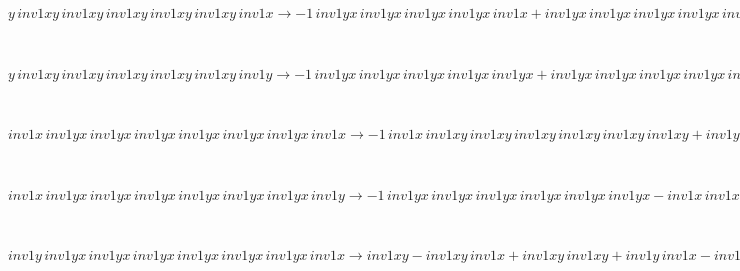 \begin{minipage}{6in}
$
y\,
 inv1xy\,
 inv1xy\,
 inv1xy\,
 inv1xy\,
 inv1xy\,
 inv1x\rightarrow -1\,
 inv1yx\,
 inv1yx\,
 inv1yx\,
 inv1yx\,
 inv1x + inv1yx\,
 inv1yx\,
 inv1yx\,
 inv1yx\,
 inv1yx\,
 inv1x + y\,
 inv1xy\,
 inv1xy\,
 inv1xy\,
 inv1xy\,
 inv1xy
$
\end{minipage}\medskip \\
\begin{minipage}{6in}
$
y\,
 inv1xy\,
 inv1xy\,
 inv1xy\,
 inv1xy\,
 inv1xy\,
 inv1y\rightarrow -1\,
 inv1yx\,
 inv1yx\,
 inv1yx\,
 inv1yx\,
 inv1yx + inv1yx\,
 inv1yx\,
 inv1yx\,
 inv1yx\,
 inv1yx\,
 inv1y
$
\end{minipage}\medskip \\
\begin{minipage}{6in}
$
inv1x\,
 inv1yx\,
 inv1yx\,
 inv1yx\,
 inv1yx\,
 inv1yx\,
 inv1yx\,
 inv1x\rightarrow -1\,
 inv1x\,
 inv1xy\,
 inv1xy\,
 inv1xy\,
 inv1xy\,
 inv1xy\,
 inv1xy + inv1yx\,
 inv1yx\,
 inv1yx\,
 inv1yx\,
 inv1yx\,
 inv1yx\,
 inv1x + inv1x\,
 inv1xy\,
 inv1xy\,
 inv1xy\,
 inv1xy\,
 inv1xy\,
 inv1xy\,
 inv1x
$
\end{minipage}\medskip \\
\begin{minipage}{6in}
$
inv1x\,
 inv1yx\,
 inv1yx\,
 inv1yx\,
 inv1yx\,
 inv1yx\,
 inv1yx\,
 inv1y\rightarrow -1\,
 inv1yx\,
 inv1yx\,
 inv1yx\,
 inv1yx\,
 inv1yx\,
 inv1yx - inv1x\,
 inv1xy\,
 inv1xy\,
 inv1xy\,
 inv1xy\,
 inv1xy\,
 inv1y + inv1x\,
 inv1yx\,
 inv1yx\,
 inv1yx\,
 inv1yx\,
 inv1yx\,
 inv1yx + inv1yx\,
 inv1yx\,
 inv1yx\,
 inv1yx\,
 inv1yx\,
 inv1yx\,
 inv1y + inv1x\,
 inv1xy\,
 inv1xy\,
 inv1xy\,
 inv1xy\,
 inv1xy\,
 inv1xy\,
 inv1y
$
\end{minipage}\medskip \\
\begin{minipage}{6in}
$
inv1y\,
 inv1yx\,
 inv1yx\,
 inv1yx\,
 inv1yx\,
 inv1yx\,
 inv1yx\,
 inv1x\rightarrow inv1xy - inv1xy\,
 inv1x + inv1xy\,
 inv1xy + inv1y\,
 inv1x - inv1y\,
 inv1xy - inv1xy\,
 inv1xy\,
 inv1x + inv1xy\,
 inv1xy\,
 inv1xy + inv1y\,
 inv1xy\,
 inv1x - inv1y\,
 inv1xy\,
 inv1xy - inv1xy\,
 inv1xy\,
 inv1xy\,
 inv1x + inv1xy\,
 inv1xy\,
 inv1xy\,
 inv1xy + inv1y\,
 inv1xy\,
 inv1xy\,
 inv1x - inv1y\,
 inv1xy\,
 inv1xy\,
 inv1xy - inv1xy\,
 inv1xy\,
 inv1xy\,
 inv1xy\,
 inv1x + inv1xy\,
 inv1xy\,
 inv1xy\,
 inv1xy\,
 inv1xy + inv1y\,
 inv1xy\,
 inv1xy\,
 inv1xy\,
 inv1x - inv1y\,
 inv1xy\,
 inv1xy\,
 inv1xy\,
 inv1xy - inv1xy\,
 inv1xy\,
 inv1xy\,
 inv1xy\,
 inv1xy\,
 inv1x + inv1xy\,
 inv1xy\,
 inv1xy\,
 inv1xy\,
 inv1xy\,
 inv1xy + inv1y\,
 inv1xy\,
 inv1xy\,
 inv1xy\,
 inv1xy\,
 inv1x - inv1y\,
 inv1xy\,
 inv1xy\,
 inv1xy\,
 inv1xy\,
 inv1xy - inv1xy\,
 inv1xy\,
 inv1xy\,
 inv1xy\,
 inv1xy\,
 inv1xy\,
 inv1x + inv1y\,
 inv1xy\,
 inv1xy\,
 inv1xy\,
 inv1xy\,
 inv1xy\,
 inv1x - inv1y\,
 inv1xy\,
 inv1xy\,
 inv1xy\,
 inv1xy\,
 inv1xy\,
 inv1xy + inv1y\,
 inv1xy\,
 inv1xy\,
 inv1xy\,
 inv1xy\,
 inv1xy\,
 inv1xy\,
 inv1x
$
\end{minipage}\medskip \\
